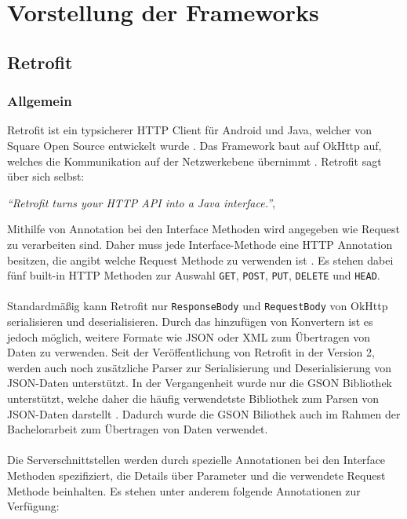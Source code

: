 \chapter{Vorstellung der Frameworks}
\label{sec:frameworks}

\section{Retrofit}

\subsection{Allgemein}
Retrofit ist ein typsicherer HTTP Client für Android und Java, welcher von Square Open Source entwickelt wurde \cite{retrofit}. Das Framework baut auf OkHttp auf, welches die Kommunikation auf der Netzwerkebene übernimmt \cite{okhttp}. Retrofit sagt über sich selbst:

\begin{center}
	\textit{\textquotedblleft Retrofit turns your HTTP API into a Java interface.\textquotedblright}, \cite[Webseite von Retrofit]{retrofit} 
	\\
\end{center}

Mithilfe von Annotation bei den Interface Methoden wird angegeben wie Request zu verarbeiten sind. Daher muss jede Interface-Methode eine HTTP Annotation besitzen, die angibt welche Request Methode zu verwenden ist \cite{retrofit}. Es stehen dabei fünf built-in HTTP Methoden zur Auswahl \texttt{GET}, \texttt{POST}, \texttt{PUT}, \texttt{DELETE} und \texttt{HEAD}.
\\\\
Standardmäßig kann Retrofit nur \texttt{ResponseBody} und \texttt{RequestBody} von OkHttp serialisieren und deserialisieren. Durch das hinzufügen von Konvertern ist es jedoch möglich, weitere Formate wie JSON oder XML zum Übertragen von Daten zu verwenden. Seit der Veröffentlichung von Retrofit in der Version 2, werden auch noch zusätzliche Parser zur Serialisierung und Deserialisierung von JSON-Daten unterstützt. In der Vergangenheit wurde nur die GSON Bibliothek unterstützt, welche daher die häufig verwendetste Bibliothek zum Parsen von JSON-Daten darstellt \cite{consumingRetrofit}. Dadurch wurde die GSON Biliothek auch im Rahmen der Bachelorarbeit zum Übertragen von Daten verwendet.
\\\\
Die Serverschnittstellen werden durch spezielle Annotationen bei den Interface Methoden spezifiziert, die Details über Parameter und die verwendete Request Methode beinhalten. Es stehen unter anderem folgende Annotationen zur Verfügung:


